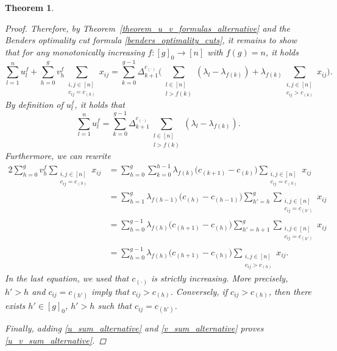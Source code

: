 \documentclass[letterpaper]{article}
\newtheorem{theorem}{Theorem}[section]
\begin{document}
\begin{theorem}
\begin{proof}
        Therefore, by Theorem~\ref{theorem_u_v_formulas_alternative} and the Benders optimality cut formula \eqref{benders_optimality_cuts}, it remains to show that for any monotonically increasing $f: [g]_0 \rightarrow [n]$ with $f(g) = n$, it holds 
        \begin{equation}\label{u_v_sum_alternative}
            \sum_{l = 1}^n u^f_l + \sum_{h = 0}^g v^f_h \sum_{\substack{i,j \in [n] \\ c_{ij} = c_{(h)}}} x_{ij} = \sum_{k = 0}^{g-1} \Delta_{k+1}^{c_{(\cdot)}} \bigg( \sum_{\substack{l \in [n] \\ l > f(k)}} (\lambda_l - \lambda_{f(k)}) + \lambda_{f(k)} \sum_{\substack{i,j \in [n] \\ c_{ij} > c_{(k)}}} x_{ij} \bigg).
        \end{equation}
        By definition of $u^f_l$, it holds that
        \begin{equation}\label{u_sum_alternative}
            \sum_{l = 1}^n u^f_l = \sum_{k = 0}^{g-1} \Delta_{k+1}^{c_{(\cdot)}} \sum_{\substack{l \in [n] \\ l > f(k)}} (\lambda_l - \lambda_{f(k)}).
        \end{equation}
        Furthermore, we can rewrite
        {\allowdisplaybreaks
        \begin{alignat}{2}\label{v_sum_alternative}
            \sum_{h = 0}^g v^f_h \sum_{\substack{i,j \in [n] \\ c_{ij} = c_{(h)}}} x_{ij} &= \sum_{h = 0}^g \sum_{k = 0}^{h-1} \lambda_{f(k)} \big(c_{(k+1)} - c_{(k)} \big) \sum_{\substack{i,j \in [n] \\ c_{ij} = c_{(h)}}} x_{ij} \nonumber \\
            & = \sum_{h = 1}^{g} \lambda_{f(h-1)} \big(c_{(h)} - c_{(h-1)} \big) \sum_{h' = h}^{g} \sum_{\substack{i,j \in [n] \\ c_{ij} = c_{(h')}}} x_{ij} \nonumber \\
            & = \sum_{h = 0}^{g-1} \lambda_{f(h)} \big(c_{(h+1)} - c_{(h)} \big) \sum_{h' = h+1}^{g} \sum_{\substack{i,j \in [n] \\ c_{ij} = c_{(h')}}} x_{ij} \nonumber \\
            & = \sum_{h = 0}^{g-1} \lambda_{f(h)} \big(c_{(h+1)} - c_{(h)} \big) \sum_{\substack{i,j \in [n] \\ c_{ij} > c_{(h)}}} x_{ij}.
        \end{alignat}
        }
        In the last equation, we used that $c_{(\cdot)}$ is strictly increasing. More precisely, $h' > h$ and $c_{ij} = c_{(h')}$ imply that $c_{ij} > c_{(h)}$. Conversely, if $c_{ij} > c_{(h)}$, then there exists $h' \in [g]_0$, $h' > h$ such that $c_{ij} = c_{(h')}$.
        
        Finally, adding \eqref{u_sum_alternative} and \eqref{v_sum_alternative} proves \eqref{u_v_sum_alternative}.
    \end{proof}
\end{theorem}
\end{document}
